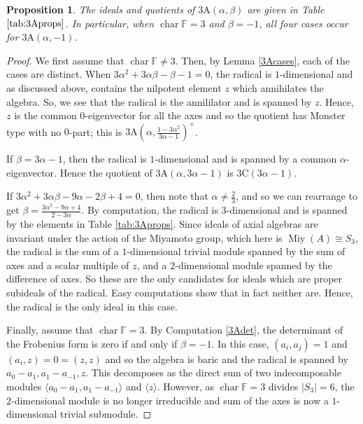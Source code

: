 \documentclass[11pt, a4paper]{article}
\theoremstyle{plain}
\newtheorem{proposition}[theorem]{Proposition}
\theoremstyle{definition}
\newcommand\al{\alpha}
\newcommand\bt{\beta}
\newcommand\la{\langle}
\newcommand\ra{\rangle}
\DeclareMathOperator{\ch}{char}
\newcommand\FF{\mathbb{F}}
\newcommand{\A}{\mathrm{A}}
\newcommand{\C}{\mathrm{C}}
\DeclareMathOperator{\Miy}{Miy}
\newcommand{\0}{\overline{0}}
\newcommand{\2}{\overline{2}}
\newcommand{\1}{\mathbbm{1}}
\begin{document}
\begin{proposition}\label{3Aclass}
The ideals and quotients of $3\A(\al, \bt)$ are given in Table $\ref{tab:3Aprops}$.  In particular, when $\ch \FF = 3$ and $\bt = -1$, all four cases occur for $3\A(\al, -1)$.
\end{proposition}
\begin{proof}
We first assume that $\ch \FF \neq 3$.  Then, by Lemma \ref{3Acases}, each of the cases are distinct.  When $3\al^2 + 3\al\bt - \bt - 1 = 0$, the radical is $1$-dimensional and as discussed above, contains the nilpotent element $z$ which annihilates the algebra.  So, we see that the radical is the annililator and is spanned by $z$.  Hence, $z$ is the common $0$-eigenvector for all the axes and so the quotient has Monster type with no $0$-part; this is $3\A(\al, \tfrac{1-3\al^2}{3\al-1})^\times$.

If $\bt = 3\al -1$, then the radical is $1$-dimensional and is spanned by a common $\al$-eigenvector.  Hence the quotient of $3\A(\al, 3\al -1)$ is $3\C(3\al-1)$.

If $3\al^2 + 3\al\bt - 9\al - 2\bt + 4 = 0$,  then note that $\alpha \neq \frac{2}{3}$, and so we can rearrange to get $\bt = \frac{3\al^2-9\al+4}{2-3\al}$.  By computation, the radical is $3$-dimensional and is spanned by the elements in Table \ref{tab:3Aprops}.  Since ideals of axial algebras are invariant under the action of the Miyamoto group, which here is $\Miy(A) \cong S_3$, the radical is the sum of a $1$-dimensional trivial module spanned by the sum of axes and a scalar multiple of $z$, and a $2$-dimensional module spanned by the difference of axes.  So these are the only candidates for ideals which are proper subideals of the radical.  Easy computations show that in fact neither are.  Hence, the radical is the only ideal in this case.

Finally, assume that $\ch \FF = 3$.  By Computation \ref{3Adet}, the determinant of the Frobenius form is zero if and only if $\bt = -1$.  In this case, $(a_i, a_j) = 1$ and $(a_i,z) = 0 = (z,z)$ and so the algebra is baric and the radical is spanned by $a_0-a_1, a_1-a_{-1}, z$.  This decomposes as the direct sum of two indecomposable modules $\la a_0 - a_1, a_1 - a_{-1} \ra$ and $\la z \ra$.  However, as $\ch \FF = 3$ divides $|S_3| = 6$, the $2$-dimensional module is no longer irreducible and sum of the axes is now a $1$-dimensional trivial submodule.


\end{proof}
\end{document}
